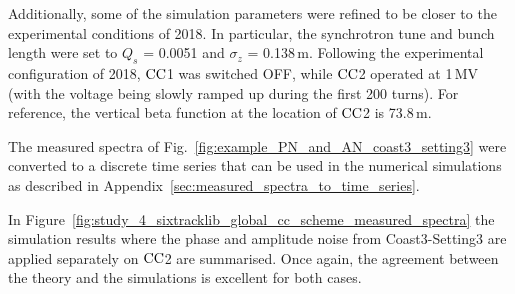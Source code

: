 Additionally, some of the simulation parameters were refined to be closer to the experimental conditions of 2018. In particular, the synchrotron tune and bunch length were set to $Q_s$ = 0.0051 and $\sigma_z$ = 0.138\,m. Following the experimental configuration of 2018, ${\mathrm{CC}}$1 was switched OFF, while ${\mathrm{CC}}$2 operated at 1\,MV (with the voltage being slowly ramped up during the first 200 turns). For reference, the vertical beta function at the location of ${\mathrm{CC}}$2 is 73.8\,m.

The measured spectra of Fig.~\ref{fig:example_PN_and_AN_coast3_setting3} were converted to a discrete time series that can be used in the numerical simulations as described in Appendix~\ref{sec:measured_spectra_to_time_series}.

In Figure~\ref{fig:study_4_sixtracklib_global_cc_scheme_measured_spectra} the simulation results where the phase and amplitude noise from Coast3-Setting3 are applied separately on ${\mathrm{CC}}$2 are summarised. Once again, the agreement between the theory and the simulations is excellent for both cases.

